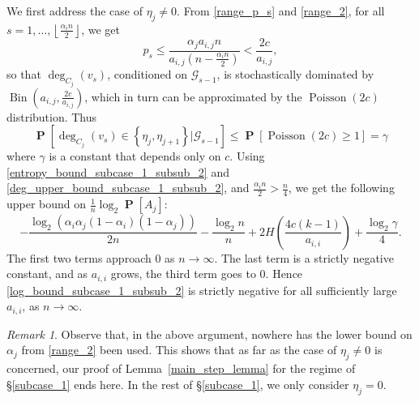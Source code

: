 \documentclass[11pt,reqno]{amsart}
\theoremstyle{definition}
\theoremstyle{remark}
\newtheorem{rem}[theorem]{Remark}
\theoremstyle{conjecture}
\DeclareMathOperator{\Prob}{\mathbf{P}}
\DeclareMathOperator{\bin}{Bin}
\DeclareMathOperator{\poi}{Poisson}
\begin{document}
We first address the case of $\eta_{j} \neq 0$. From \eqref{range_p_s} and \eqref{range_2}, for all $s = 1, \ldots, \left\lfloor\frac{\alpha_{i} n}{2}\right\rfloor$, we get
\begin{equation}\label{p_s_upper_subcase_1}
p_{s} \leqslant \frac{\alpha_{j} a_{i,j} n}{a_{i,j}\left(n - \frac{\alpha_{i}n}{2}\right)} < \frac{2c}{a_{i,j}}, 
\end{equation} 
so that $\deg_{C_{j}}(v_{s})$, conditioned on $\mathcal{G}_{s-1}$, is stochastically dominated by $\bin\left(a_{i,j}, \frac{2c}{a_{i,j}}\right)$, which in turn can be approximated by the $\poi(2c)$ distribution. Thus 
\begin{equation}\label{deg_upper_bound_subcase_1_subsub_2}
\Prob\left[\deg_{C_{j}}(v_{s}) \in \left\{\eta_{j}, \eta_{j+1}\right\}\Big|\mathcal{G}_{s-1}\right] \leqslant \Prob\left[\poi(2c) \geqslant 1\right] = \gamma
\end{equation}
where $\gamma$ is a constant that depends only on $c$. Using \eqref{entropy_bound_subcase_1_subsub_2} and \eqref{deg_upper_bound_subcase_1_subsub_2}, and $\frac{\alpha_{i} n}{2} > \frac{n}{4}$, we get the following upper bound on $\frac{1}{n} \log_{2} \Prob[A_{j}]$:
\begin{equation}\label{log_bound_subcase_1_subsub_2}
-\frac{\log_{2}\left(\alpha_{i} \alpha_{j} (1-\alpha_{i}) (1-\alpha_{j})\right)}{2n} - \frac{\log_{2} n}{n} + 2 H\left(\frac{4 c (k-1)}{a_{i,i}}\right) + \frac{\log_{2} \gamma}{4}.
\end{equation}
The first two terms approach $0$ as $n \rightarrow \infty$. The last term is a strictly negative constant, and as $a_{i,i}$ grows, the third term goes to $0$. Hence \eqref{log_bound_subcase_1_subsub_2} is strictly negative for all sufficiently large $a_{i,i}$, as $n \rightarrow \infty$. 

\begin{rem}\label{no_need_2}
Observe that, in the above argument, nowhere has the lower bound on $\alpha_{j}$ from \eqref{range_2} been used. This shows that as far as the case of $\eta_{j} \neq 0$ is concerned, our proof of Lemma~\ref{main_step_lemma} for the regime of \S\ref{subcase_1} ends here. In the rest of \S\ref{subcase_1}, we only consider $\eta_{j} = 0$.
\end{rem}
\end{document}
